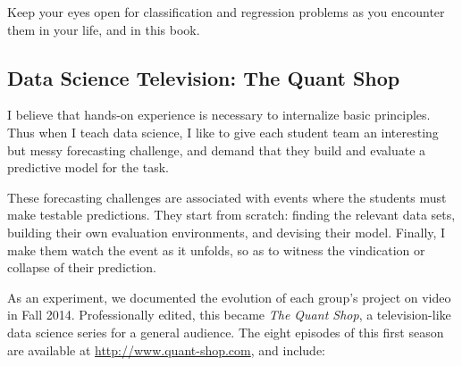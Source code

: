 \documentclass[10pt]{article}
\begin{document}
Keep your eyes open for classification and regression problems as you encounter them in your life, and in this book.

\subsection{Data Science Television: The Quant Shop}
I believe that hands-on experience is necessary to internalize basic principles. Thus when I teach data science, I like to give each student team an interesting but messy forecasting challenge, and demand that they build and evaluate a predictive model for the task.

These forecasting challenges are associated with events where the students must make testable predictions. They start from scratch: finding the relevant data sets, building their own evaluation environments, and devising their model. Finally, I make them watch the event as it unfolds, so as to witness the vindication or collapse of their prediction.

As an experiment, we documented the evolution of each group's project on video in Fall 2014. Professionally edited, this became \emph{The Quant Shop}, a television-like data science series for a general audience. The eight episodes of this first season are available at \href{http://www.quant-shop.com}{http://www.quant-shop.com}, and include:
\end{document}
